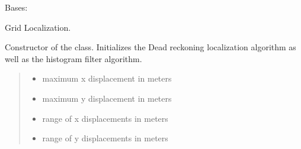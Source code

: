 \documentclass[letterpaper,10pt,english]{sphinxmanual}
\begin{document}
\begin{fulllineitems}
\label{\detokenize{GridLocalization:GL.GL}}
\pysigstartsignatures
{}
\pysigstopsignatures
\sphinxAtStartPar
Bases: {\hyperref[\detokenize{HF:HF.HF}]{}}

\sphinxAtStartPar
Grid Localization.

\begin{fulllineitems}
\label{\detokenize{GridLocalization:GL.GL.__init__}}
\pysigstartsignatures
{}
\pysigstopsignatures
\sphinxAtStartPar
Constructor of the  class. Initializes the Dead reckoning localization algorithm as well as the histogram filter algorithm.
\begin{quote}\begin{description}
\begin{itemize}
\item {} 
\sphinxAtStartPar
{} \textendash{} maximum x displacement in meters

\item {} 
\sphinxAtStartPar
{} \textendash{} maximum y displacement in meters

\item {} 
\sphinxAtStartPar
{} \textendash{} range of x displacements in meters

\item {} 
\sphinxAtStartPar
{} \textendash{} range of y displacements in meters


\end{itemize}
\end{description}
\end{quote}
\end{fulllineitems}
\end{fulllineitems}
\end{document}

